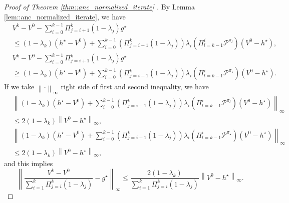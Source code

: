\documentclass{article} %
\newcommand{\cP}{\mathcal{P}}
\newcommand*{\para}[1]{\left({#1}\right)}
\newcommand*{\infn}[1]{\left\|{#1}\right\|_{\infty}}
\begin{document}
\begin{proof}[Proof of Theorem \ref{thm::anc_normalized_iterate} ]
By Lemma \ref{lem::anc_normalized_iterate}, we have 
\begin{align*}
    &V^k-V^0-\sum_{i=0}^{k-1} \Pi^k_{j=i+1} (1-\lambda_j)g^{\star} \\& \le (1-\lambda_k) (h^{\star}-V^0) +\sum_{i=0}^{k-1} (\Pi^k_{j=i+1} (1-\lambda_j)) \lambda_{i}\para{\Pi^{i}_{l=k-1}\cP^{\pi_l}}(V^0-h^{\star}), 
    \\&V^k-V^0-\sum_{i=0}^{k-1} \Pi^k_{j=i+1} (1-\lambda_j)g^{\star} \\& \ge (1-\lambda_k) (h^{\star}-V^0) +\sum_{i=0}^{k-1} (\Pi^k_{j=i+1} (1-\lambda_j)) \lambda_{i}\para{\Pi^{i}_{l=k-1}\cP^{\pi_{\star}}}(V^0-h^{\star}).
\end{align*}
If we take $\infn{\cdot}$ right side of first and second inequality, we have 
   \begin{align*}
       &\infn{(1-\lambda_k) (h^{\star}-V^0) +\sum_{i=0}^{k-1} (\Pi^k_{j=i+1} (1-\lambda_j)) \lambda_{i}\para{\Pi^{i}_{l=k-1}\cP^{\pi_l}}(V^0-h^{\star})} \\& \le 2(1-\lambda_k)\infn{V^0-h^{\star}},\\
       & \infn{(1-\lambda_k) (h^{\star}-V^0) +\sum_{i=0}^{k-1} (\Pi^k_{j=i+1} (1-\lambda_j)) \lambda_{i}\para{\Pi^{i}_{l=k-1}\cP^{\pi_{\star}}}(V^0-h^{\star})} \\& \le 2(1-\lambda_k)\infn{V^0-h^{\star}},
   \end{align*}
   and this implies
   \[\infn{\frac{V^k-V^0}{\sum_{i=1}^{k} \Pi^k_{j=i} (1-\lambda_j)}-g^{\star}} \le \frac{2(1-\lambda_k)}{\sum_{i=1}^{k} \Pi^k_{j=i} (1-\lambda_j)}\infn{V^0-h^{\star}}.\]
\end{proof}
\end{document}
